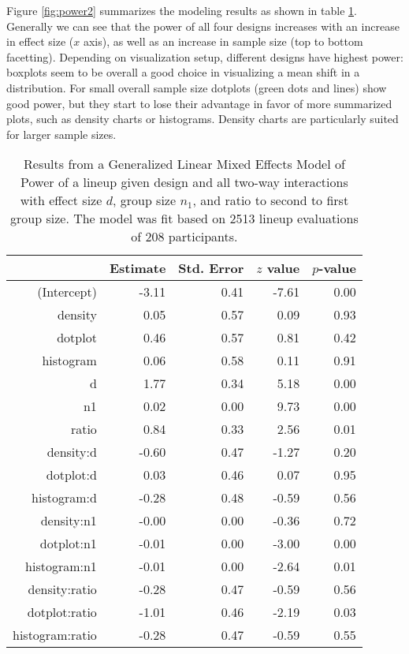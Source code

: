 Figure \ref{fig:power2} summarizes the modeling results as shown in table \ref{tbl:power2}. Generally we can see that the power of all four designs increases with an increase in effect size ($x$ axis), as well as an increase in sample size (top to bottom facetting). Depending on visualization setup, different designs have highest power: boxplots seem to be overall a good choice in visualizing a mean shift in a distribution. For small overall sample size dotplots (green dots and lines) show good power, but they  start to lose their advantage in favor of more summarized plots, such as density charts or histograms. Density charts are particularly suited for larger sample sizes.
\begin{table}[ht]
\begin{center}
\begin{tabular}{rrrrr}
  \hline
 & Estimate & Std. Error & $z$ value & $p$-value \\ 
  \hline
(Intercept) & -3.11 & 0.41 & -7.61 & 0.00 \\ 
  density & 0.05 & 0.57 & 0.09 & 0.93 \\ 
  dotplot & 0.46 & 0.57 & 0.81 & 0.42 \\ 
  histogram & 0.06 & 0.58 & 0.11 & 0.91 \\ 
  d & 1.77 & 0.34 & 5.18 & 0.00 \\ 
  n1 & 0.02 & 0.00 & 9.73 & 0.00 \\ 
  ratio & 0.84 & 0.33 & 2.56 & 0.01 \\ 
  density:d & -0.60 & 0.47 & -1.27 & 0.20 \\ 
  dotplot:d & 0.03 & 0.46 & 0.07 & 0.95 \\ 
  histogram:d & -0.28 & 0.48 & -0.59 & 0.56 \\ 
  density:n1 & -0.00 & 0.00 & -0.36 & 0.72 \\ 
  dotplot:n1 & -0.01 & 0.00 & -3.00 & 0.00 \\ 
  histogram:n1 & -0.01 & 0.00 & -2.64 & 0.01 \\ 
  density:ratio & -0.28 & 0.47 & -0.59 & 0.56 \\ 
  dotplot:ratio & -1.01 & 0.46 & -2.19 & 0.03 \\ 
  histogram:ratio & -0.28 & 0.47 & -0.59 & 0.55 \\ 
   \hline
\end{tabular}
\end{center}
\caption{Results from a Generalized Linear Mixed Effects Model of Power of a lineup given design and all two-way interactions with effect size $d$, group size $n_1$, and ratio to second to first group size. The model was fit based on 2513 lineup evaluations of 208 participants.}
\label{tbl:power2}
\end{table}

